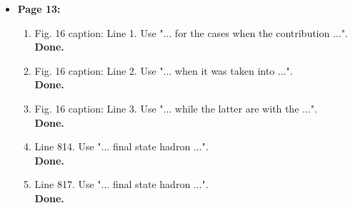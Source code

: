 \documentclass[,superscriptaddress,showpacs,amssymb,amsmath,amsfonts,linenumbers,article]{revtex4-1}
\begin{document}
\begin{itemize}
\begin{enumerate}
{\bf Done.}
\item Line 766. Use "... from the empty cells ...".\\
{\bf Done.}
\item Line 770. Use "... due to the negligible/zero CLAS acceptance in these regions.".\\
{\bf The sentence was changed to "...  due to the negligible/zero CLAS acceptance in the corresponding directions."}
\item Line 776. Use "... total statistical uncertainty, as was done in Refs.~[6,22].".\\
{\bf Done.}
\item Line 780. Use "... using the TWOPEG ...".\\
{\bf Done.}
\item Line 781. Use "... [21], which accounts ...".\\
{\bf Done.}
\item Line 783. Use "... known approach of Ref.~[15].".\\
{\bf Done.}
\item Line 785. Use "... cross sections from the non-radiative cross sections."\\
{\bf We prefer to keep our version.}
\item Line 787. Use "... in TWOPEG, the double-pion ...".\\
{\bf Done.}
\item Line 790. Use "... electron (the so-called ...".\\
{\bf Done.}
\item Line 792. Use "In Refs.~[15,21] the ...".\\
{\bf Done.}

 
\end{enumerate} 
 
\item {\bf \large  Page 13:}
\begin{enumerate}

\item Fig. 16 caption: Line 1. Use "... for the cases when the contribution ...".\\
{\bf Done.}
\item Fig. 16 caption: Line 2. Use "... when it was taken into ...".\\
{\bf Done.}
\item Fig. 16 caption: Line 3. Use "... while the latter are with the ...".\\
{\bf Done.}
\item Line 814. Use "... final state hadron ...".\\
{\bf Done.}
\item Line 817. Use "... final state hadron ...".\\
{\bf Done.}


\end{enumerate}
\end{itemize}
\end{document}
